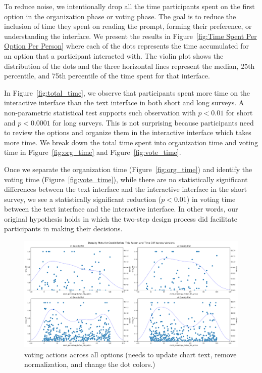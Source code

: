 To reduce noise, we intentionally drop all the time participants spent on the first option in the organization phase or voting phase. The goal is to reduce the inclusion of time they spent on reading the prompt, forming their preference, or understanding the interface. We present the results in Figure~\ref{fig:Time Spent Per Option Per Person} where each of the dots represents the time accumulated for an option that a participant interacted with. The violin plot shows the distribution of the dots and the three horizontal lines represent the median, 25th percentile, and 75th percentile of the time spent for that interface.

In Figure~\ref{fig:total_time}, we observe that participants spent more time on the interactive interface than the text interface in both short and long surveys. A non-parametric statistical test supports such observation with $p<0.01$ for short and $p<0.0001$ for long surveys. This is not surprising because participants need to review the options and organize them in the interactive interface which takes more time. We break down the total time spent into organization time and voting time in Figure~\ref{fig:org_time} and Figure~\ref{fig:vote_time}.

Once we separate the organization time (Figure~\ref{fig:org_time}) and identify the voting time (Figure~\ref{fig:vote_time}), while there are no statistically significant differences between the text interface and the interactive interface in the short survey, we see a statistically significant reduction ($p<0.01$) in voting time between the text interface and the interactive interface. In other words, our original hypothesis holds in which the two-step design process did facilitate participants in making their decisions.

\begin{figure}[ht]
    \centering
    \includegraphics[width=\textwidth]{content/image/results/diff_con.png}
    \caption{voting actions across all options (needs to update chart text, remove normalization, and change the dot colors.)}
    \label{fig:voting_all}
\end{figure}

